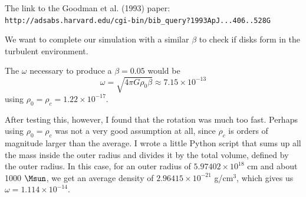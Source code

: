 \documentclass[11pt,letterpaper]{article}
\begin{document}
The link to the Goodman et al. (1993) paper:\\
{\tt http://adsabs.harvard.edu/cgi-bin/bib\_query?1993ApJ...406..528G}

We want to complete our simulation with a similar $\beta$ to check if disks form in the turbulent environment.

The $\omega$ necessary to produce a $\beta = 0.05$ would be
\begin{equation}
\omega = \sqrt{4 \pi G \rho_0 \beta} \approx 7.15\times 10^{-13}
\end{equation}
using $\rho_0 = \rho_c = 1.22\times10^{-17}$.

After testing this, however, I found that the rotation was much too fast. Perhaps using $\rho_0 = \rho_c$ was not a very good assumption at all, since $\rho_c$ is orders of magnitude larger than the average. I wrote a little Python script that sums up all the mass inside the outer radius and divides it by the total volume, defined by the outer radius. In this case, for an outer radius of $5.97402\times 10^{18}$ cm and about 1000 $\Msun$, we get an average density of $2.96415\times 10^{-21}$ g/cm$^3$, which gives us $\omega = 1.114 \times 10^{-14}$.
\end{document}
